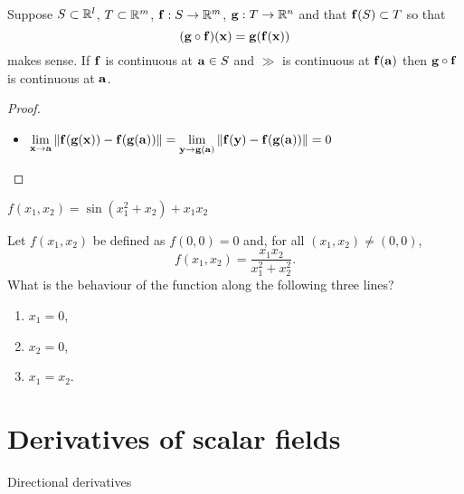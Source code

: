 \begin{theorem}
    Suppose \(S \subset \bR^l\), \(T\subset \bR^m\), \(\ff:S \to \bR^m\), \(\gg : T \to \bR^n\) and that \(\ff(S) \subset T\) so that
    \[(\gg \circ \ff)(\xx) = \gg(\ff(\xx))\]
    makes sense.
    If \(\ff\) is continuous at \(\aa\in S\) and \(\gg\) is continuous at \(\ff(\aa)\) then \(\gg\circ \ff\) is continuous at \(\aa\).
\end{theorem}

\begin{proof}
    \begin{itemize}
        \item \(\displaystyle\lim_{\xx\to\aa}\norm{\ff(\gg(\xx))-\ff(\gg(\aa))}  =\displaystyle\lim_{\yy\to\gg(\aa)}\norm{\ff(\yy)-\ff(\gg(\aa))}  =0   \)
    \end{itemize}
\end{proof}

\begin{example*}
    \(f(x_1,x_2)= \sin(x_1^2 + x_2) + x_1 x_2\)
\end{example*}




{}

\begin{example*}
    Let \(f(x_1,x_2)\) be defined as \(f(0,0)=0\) and, for all \((x_1,x_2)\neq (0,0)\),
    \[
        f(x_1,x_2) =
        \frac{x_1x_2}{x_1^2 + x_2^2}.
    \]
    What is the behaviour of the function along the following three lines?
    \begin{enumerate}
        \item \(x_1=0\),
        \item \(x_2=0\),
        \item \(x_1=x_2\).
    \end{enumerate}
\end{example*}



\section{Derivatives of scalar fields}


 {Directional derivatives}






